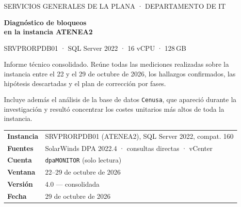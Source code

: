 \documentclass[11pt,a4paper]{article}
\newcommand{\cod}[1]{\texttt{\small #1}}
\begin{document}
\begin{titlepage}
\centering
\vspace*{2.5cm}

{\color{gris}\large SERVICIOS GENERALES DE LA PLANA · DEPARTAMENTO DE IT}

\vspace{1.4cm}
{\Huge\bfseries\color{tinta} Diagnóstico de bloqueos\\[0.35cm] en la instancia ATENEA2}

\vspace{0.8cm}
{\large\color{gris} SRVPRORPDB01 · SQL Server 2022 · 16 vCPU · 128\,GB}

\vspace{2.2cm}
\begin{minipage}{0.82\textwidth}
\color{tinta}\normalsize
Informe técnico consolidado. Reúne todas las mediciones realizadas sobre la
instancia entre el 22 y el 29 de octubre de 2026, los hallazgos confirmados,
las hipótesis descartadas y el plan de corrección por fases.

\vspace{0.5cm}
Incluye además el análisis de la base de datos \cod{Cenusa}, que apareció
durante la investigación y resultó concentrar los costes unitarios más altos
de toda la instancia.
\end{minipage}

\vfill
\begin{minipage}{0.82\textwidth}
\color{gris}\small
\begin{tabular}{@{}ll@{}}
\textbf{Instancia}   & SRVPRORPDB01 (ATENEA2), SQL Server 2022, compat. 160 \\
\textbf{Fuentes}     & SolarWinds DPA 2022.4 · consultas directas · vCenter \\
\textbf{Cuenta}      & \cod{dpaMONITOR} (solo lectura) \\
\textbf{Ventana}     & 22--29 de octubre de 2026 \\
\textbf{Versión}     & 4.0 — consolidada \\
\textbf{Fecha}       & 29 de octubre de 2026 \\
\end{tabular}
\end{minipage}

\vspace{1cm}
\end{titlepage}

\end{document}
